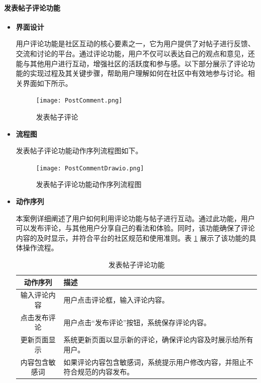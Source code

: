 \paragraph{发表帖子评论功能}

\begin{itemize}
	\item \textbf{界面设计}
	
	用户评论功能是社区互动的核心要素之一，它为用户提供了对帖子进行反馈、交流和讨论的平台。通过评论功能，用户不仅可以表达自己的观点和意见，还能与其他用户进行互动，增强社区的活跃度和参与感。以下部分展示了评论功能的实现过程及其关键步骤，帮助用户理解如何在社区中有效地参与讨论。相关界面如下所示。
	
	\begin{figure}[H]
		\centering
		\texttt{[image: PostComment.png]} 
		\caption{发表帖子评论}
		\label{fig:post-comment}
	\end{figure}
	
	\item \textbf{流程图}
	
	发表帖子评论功能动作序列流程图如下。
	
	\begin{figure}[H]
		\centering
		\texttt{[image: PostCommentDrawio.png]} 
		\caption{发表帖子评论功能动作序列流程图}
		\label{fig:post-comment.drawio}
	\end{figure}
	
	\item \textbf{动作序列}
	
	本案例详细阐述了用户如何利用评论功能与帖子进行互动。通过此功能，用户可以发布评论，与其他用户分享自己的看法和体验。同时，该功能确保了评论内容的及时显示，并符合平台的社区规范和使用准则。表 \ref{table:post-comment} 展示了该功能的具体操作流程。
	
	\begin{table}[H]
		\centering
		\caption{发表帖子评论功能}
		\renewcommand\arraystretch{1.5}
		\begin{tabular}{|c|>{\raggedright\arraybackslash}p{8cm}|}
			\hline
			\textbf{动作序列} & \textbf{描述} \\ \hline
			输入评论内容 & 用户点击评论框，输入评论内容。 \\ \hline
			点击发布评论 & 用户点击“发布评论”按钮，系统保存评论内容。 \\ \hline
			更新页面显示 & 系统更新页面以显示新的评论，确保评论内容及时展示给所有用户。 \\ \hline
			内容包含敏感词 & 如果评论内容包含敏感词，系统提示用户修改内容，并阻止不符合规范的内容发布。 \\ \hline
		\end{tabular}
		\label{table:post-comment}
	\end{table}
	

\end{itemize}
